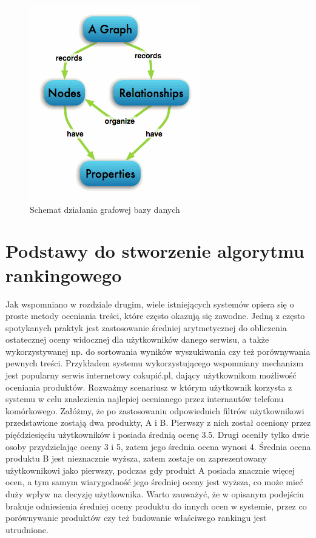 \begin{figure}[h]
	\centering
	\includegraphics[scale=1]{images/graphdb.png}
	\caption{Schemat działania grafowej bazy danych}
\end{figure}

\section{Podstawy do stworzenie algorytmu rankingowego}

Jak wspomniano w rozdziale drugim, wiele istniejących systemów opiera się o proste metody oceniania treści, które często okazują się zawodne. Jedną z często spotykanych praktyk jest zastosowanie średniej arytmetycznej do obliczenia ostatecznej oceny widocznej dla użytkowników danego serwisu, a także wykorzystywanej np. do sortowania wyników wyszukiwania czy też porównywania pewnych treści. Przykładem systemu wykorzystującego wspomniany mechanizm jest popularny serwis internetowy cokupić.pl, dający użytkownikom możliwość oceniania produktów. Rozważmy scenariusz w którym użytkownik korzysta z systemu w celu znalezienia najlepiej ocenianego przez internautów telefonu komórkowego. Załóżmy, że po zastosowaniu odpowiednich filtrów użytkownikowi przedstawione zostają dwa produkty, A i B. Pierwszy z nich został oceniony przez pięćdziesięciu użytkowników i posiada średnią ocenę 3.5. Drugi oceniły tylko dwie osoby przydzielając oceny 3 i 5, zatem jego średnia ocena wynosi 4. Średnia ocena produktu B jest nieznacznie wyższa, zatem zostaje on zaprezentowany użytkownikowi jako pierwszy, podczas gdy produkt A posiada znacznie więcej ocen, a tym samym wiarygodność jego średniej oceny jest wyższa, co może mieć duży wpływ na decyzję użytkownika. Warto zauważyć, że w opisanym podejściu brakuje odniesienia średniej oceny produktu do innych ocen w systemie, przez co porównywanie produktów czy też budowanie właściwego rankingu jest utrudnione.

